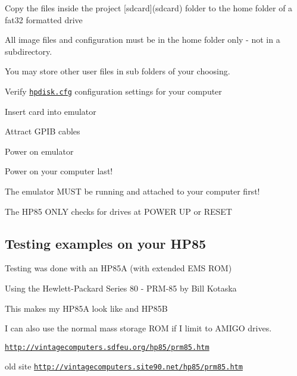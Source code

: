 \begin{DoxyItemize}
\begin{DoxyItemize}
\begin{DoxyItemize}
\item Copy the files inside the project \mbox{[}sdcard\mbox{]}(sdcard) folder to the home folder of a fat32 formatted drive
\begin{DoxyItemize}
\item All image files and configuration must be in the home folder only -\/ not in a subdirectory.
\item You may store other user files in sub folders of your choosing.
\end{DoxyItemize}
\item Verify \href{sdcard/hpdisk.cfg}{\tt hpdisk.\+cfg} configuration settings for your computer
\item Insert card into emulator
\item Attract G\+P\+IB cables
\item Power on emulator
\item Power on your computer last!
\begin{DoxyItemize}
\item The emulator M\+U\+ST be running and attached to your computer first!
\item The H\+P85 O\+N\+LY checks for drives at P\+O\+W\+ER UP or R\+E\+S\+ET
\end{DoxyItemize}
\end{DoxyItemize}
\end{DoxyItemize}
\end{DoxyItemize}

\subsection*{Testing examples on your H\+P85}


\begin{DoxyItemize}
\item Testing was done with an H\+P85A (with extended E\+MS R\+OM)
\begin{DoxyItemize}
\item Using the Hewlett-\/\+Packard Series 80 -\/ P\+R\+M-\/85 by Bill Kotaska
\item This makes my H\+P85A look like and H\+P85B
\begin{DoxyItemize}
\item I can also use the normal mass storage R\+OM if I limit to A\+M\+I\+GO drives.
\item \href{http://vintagecomputers.sdfeu.org/hp85/prm85.htm}{\tt http\+://vintagecomputers.\+sdfeu.\+org/hp85/prm85.\+htm}
\begin{DoxyItemize}
\item old site \href{http://vintagecomputers.site90.net/hp85/prm85.htm}{\tt http\+://vintagecomputers.\+site90.\+net/hp85/prm85.\+htm}
\end{DoxyItemize}
\end{DoxyItemize}
\end{DoxyItemize}
\end{DoxyItemize}

